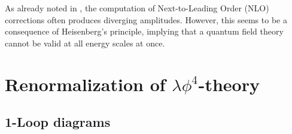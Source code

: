 
As already noted in , the computation of Next-to-Leading Order (NLO) corrections often produces diverging amplitudes. However, this seems to be a consequence of Heisenberg's principle, implying that a quantum field theory cannot be valid at all energy scales at once.

\section{Renormalization of \texorpdfstring{$ \lambda \phi^4 $}{λφ4}-theory}

\subsection{1-Loop diagrams}

